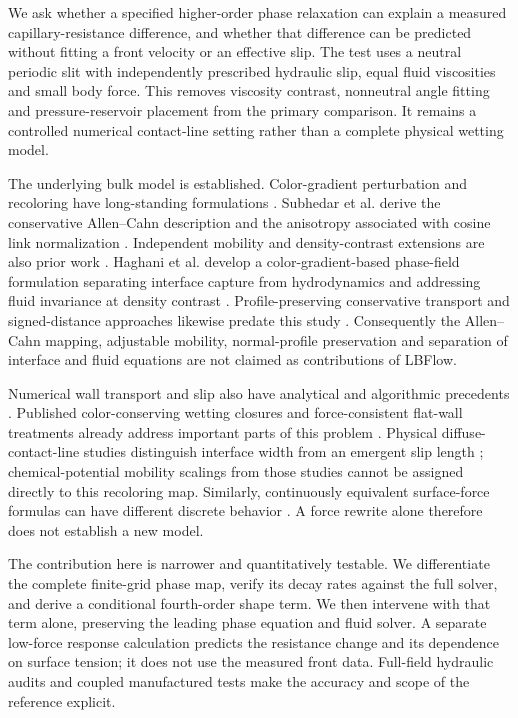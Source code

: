 \documentclass[preprint,12pt]{elsarticle}
\begin{document}
We ask whether a specified higher-order phase relaxation can explain a
measured capillary-resistance difference, and whether that difference can be
predicted without fitting a front velocity or an effective slip. The test
uses a neutral periodic slit with independently prescribed hydraulic slip,
equal fluid viscosities and small body force. This removes viscosity contrast,
nonneutral angle fitting and pressure-reservoir placement from the primary
comparison. It remains a controlled numerical contact-line setting rather
than a complete physical wetting model.

The underlying bulk model is established. Color-gradient perturbation and
recoloring have long-standing formulations
\cite{latva2005,reis2007,liu2012,liuerratum2012}.
Subhedar et al. derive the conservative Allen--Cahn description and the
anisotropy associated with cosine link normalization \cite{subhedar2020}.
Independent mobility and density-contrast extensions are also prior work
\cite{subhedar2022}. Haghani et al. develop a color-gradient-based phase-field
formulation separating interface capture from hydrodynamics and addressing
fluid invariance at density contrast \cite{haghani2024}.
Profile-preserving conservative transport and signed-distance approaches
likewise predate this study \cite{mirjalili2020,hao2024}.
Consequently the Allen--Cahn mapping, adjustable mobility, normal-profile
preservation and separation of interface and fluid equations are not claimed
as contributions of LBFlow.

Numerical wall transport and slip also have analytical and algorithmic
precedents \cite{ginzburg2015,ahmed2009}. Published color-conserving wetting
closures and force-consistent flat-wall treatments already address important
parts of this problem \cite{hollis2011,liu2015,yu2018}.
Physical diffuse-contact-line studies distinguish interface width from
an emergent slip length \cite{kusumaatmaja2016}; chemical-potential mobility
scalings from those studies cannot be assigned directly to this recoloring
map. Similarly, continuously equivalent surface-force formulas can have
different discrete behavior \cite{sugimoto2026}. A force rewrite alone
therefore does not establish a new model.

The contribution here is narrower and quantitatively testable. We
differentiate the complete finite-grid phase map, verify its decay rates
against the full solver, and derive a conditional fourth-order shape term.
We then intervene with that term alone, preserving the leading phase
equation and fluid solver. A separate low-force response calculation predicts
the resistance change and its dependence on surface tension; it does not
use the measured front data. Full-field hydraulic audits and coupled
manufactured tests make the accuracy and scope of the reference explicit.
\end{document}
